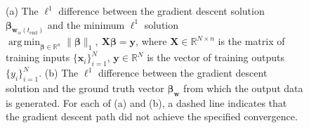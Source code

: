 \documentclass{article}
\DeclareMathOperator*{\argmin}{arg\,min}
\begin{document}
\begin{figure}[H]
    \centering
    \hfill
    \caption{(a) The $\ell^1$ difference between the gradient descent solution $\boldsymbol{\beta}_{\boldsymbol{w}_{\alpha}(t_{\text{end}})}$ and the minimum $\ell^1$ solution $\argmin_{\boldsymbol{\beta} \in \mathbb{R}^n} \| \boldsymbol{\beta} \|_1, \ \boldsymbol{X} \boldsymbol{\beta} = \boldsymbol{y}$, where $\boldsymbol{X} \in \mathbb{R}^{N \times n}$ is the matrix of training inputs $\{ \boldsymbol{x}_i \}_{i=1}^N$, $\boldsymbol{y} \in \mathbb{R}^N$ is the vector of training outputs $\{y_i\}_{i=1}^N$. (b) The $\ell^1$ difference between the gradient descent solution and the ground truth vector $\boldsymbol{\beta}_{\boldsymbol{w}}$ from which the output data is generated. For each of (a) and (b), a dashed line indicates that the gradient descent path did not achieve the specified convergence.}\label{fig:l1error}
\end{figure}
\end{document}
